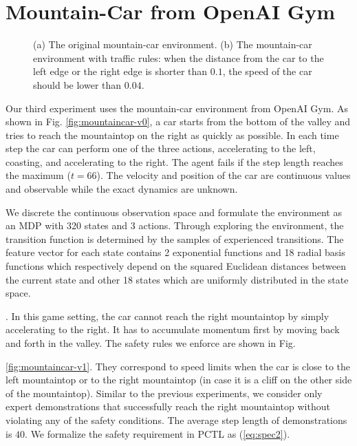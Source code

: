 {\section{Mountain-Car from OpenAI Gym}
\begin{figure}[h]
\centering
{}
\caption[The mountaincar environment]{(a) The original mountain-car environment. (b) The mountain-car environment with traffic rules: when the distance from the car to the left edge or the right edge is shorter than $0.1$, the speed of the car should be lower than $0.04$.}  
\label{fig:mountaincar}
\end{figure}

Our third experiment uses the mountain-car environment from OpenAI Gym. As shown in Fig. {\ref{fig:mountaincar-v0}}, a car starts from the bottom of the valley and tries to reach the mountaintop on the right as quickly as possible. In each time step the car can perform one of the three actions, accelerating to the left, coasting, and accelerating to the right. The agent fails if the step length reaches the maximum ($t=66$). The velocity and position of the car are continuous values and observable while the exact dynamics are unknown.

We discrete the continuous observation space and formulate the environment as an MDP with 320 states and 3 actions. Through exploring the environment, the transition function is determined by the samples of experienced transitions. The feature vector for each state contains 2 exponential functions and 18 radial basis functions which respectively depend on the squared Euclidean distances between the current state and other 18 states which are uniformly distributed in the state space.}. In this game setting, the car cannot reach the right mountaintop by simply accelerating to the right. It has to accumulate momentum first by moving back and forth in the valley. The safety rules we enforce are shown in Fig.~{\ref{fig:mountaincar-v1}. They correspond to speed limits when the car is close to the left mountaintop or to the right mountaintop (in case it is a cliff on the other side of the mountaintop). Similar to the previous experiments, we consider only expert demonstrations that successfully reach the right mountaintop without violating any of the safety conditions. 
The average step length of demonstrations is $40$. 
 We formalize the safety requirement in PCTL as (\ref{eq:spec2}). 

}
